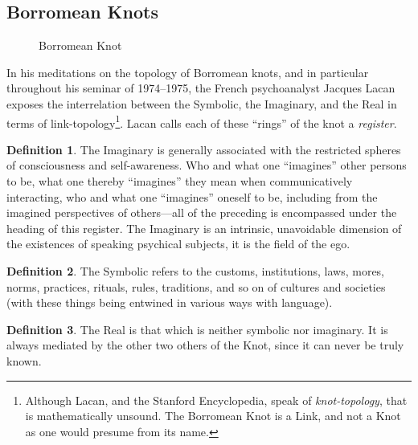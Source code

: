 \documentclass[11pt,letterpaper]{article}
\theoremstyle{definition}
\newtheorem{defn}{Definition}[section]
\begin{document}
\subsection{Borromean Knots}
\begin{figure}
    \caption{Borromean Knot}\label{fig:borromean}
\end{figure}
In his meditations on the topology of Borromean knots, and in particular throughout his seminar of 1974--1975, the French psychoanalyst Jacques Lacan exposes the interrelation between the Symbolic, the Imaginary, and the Real in terms of link-topology\autocite{rolfsen_2004}\footnote{Although Lacan, and the Stanford Encyclopedia, speak of \emph{knot-topology}, that is mathematically unsound. The Borromean Knot is a Link, and not a Knot as one would presume from its name.}. Lacan calls each of these ``rings'' of the knot a \emph{register}.

\begin{defn}\label{def:imaginary}
    The Imaginary is generally associated with the restricted spheres of consciousness and self-awareness. Who and what one ``imagines'' other persons to be, what one thereby ``imagines'' they mean when communicatively interacting, who and what one ``imagines'' oneself to be, including from the imagined perspectives of others—all of the preceding is encompassed under the heading of this register. The Imaginary is an intrinsic, unavoidable dimension of the existences of speaking psychical subjects, it is the field of the ego.\autocite{sep-lacan}
\end{defn}
\begin{defn}\label{def:symbolic}
    The Symbolic refers to the customs, institutions, laws, mores, norms, practices, rituals, rules, traditions, and so on of cultures and societies (with these things being entwined in various ways with language).\autocite{sep-lacan}
\end{defn}
\begin{defn}\label{def:real}
    The Real is that which is neither symbolic nor imaginary. It is always mediated by the other two others of the Knot, since it can never be truly known.
\end{defn}
\end{document}
